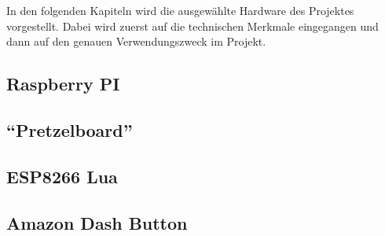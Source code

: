 
In den folgenden Kapiteln wird die ausgewählte Hardware des Projektes vorgestellt. Dabei wird zuerst auf die technischen Merkmale eingegangen und dann auf den genauen Verwendungszweck im Projekt. 

\subsection{Raspberry PI}        
\label{sec:Raspberry PI-1} 


\newpage

\subsection{``Pretzelboard''}        
\label{sec:Pretzelboard-1} 

\newpage

\subsection{ESP8266 Lua}
\label{sec:ESP8266}



\subsection{Amazon Dash Button}
\label{sec:Amazon Dash Button}


\newpage